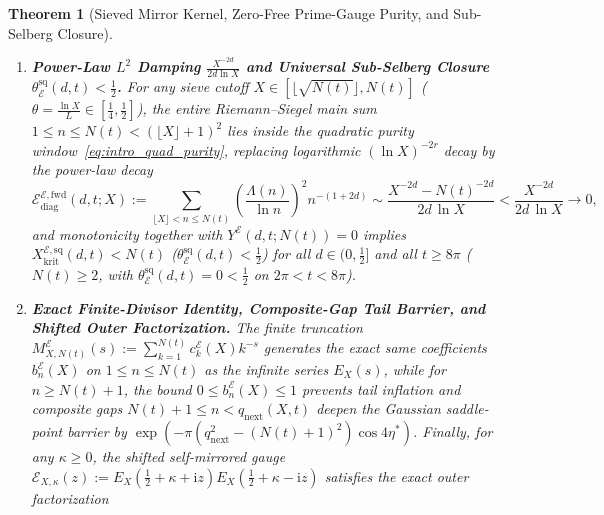 \documentclass[11pt,reqno]{amsart}
\newtheorem{theorem}{Theorem}[section]
\theoremstyle{definition}
\theoremstyle{remark}
\numberwithin{equation}{section}
\newcommand{\ii}{\mathrm{i}}
\begin{document}
\begin{theorem}[Sieved Mirror Kernel, Zero-Free Prime-Gauge Purity, and Sub-Selberg Closure]
\begin{enumerate}[label=\textup{(\roman*)},leftmargin=2.2em]
\begin{equation}\label{eq:intro_quad_purity}
b_N^{\mathcal{E}}(X) \equiv \frac{\Lambda(N)}{\ln N} \qquad \text{for all } \lfloor X\rfloor < N < (\lfloor X\rfloor + 1)^2,
\end{equation}
so every composite integer with $\ge 2$ distinct prime factors in $(X, X^2]$ vanishes identically. Moreover, in the weighted gauge $\mathcal{E}_{X,\mathbf{w}}(z)$, the negative hyperbolic mirror weight $w_n^*(d_0) := -(n^{2d_0}-1)^{-1} < 0$ annihilates the effective prime-power amplitude $C_n(d_0, w_n^*(d_0)) \equiv 0$ for all $2 \le n \le \lfloor X\rfloor$ on $d = d_0$ while introducing zero terms for $n > X$ ($0\%$ waterbed tail).
\item \textbf{Power-Law $L^2$ Damping $\frac{X^{-2d}}{2d\ln X}$ and Universal Sub-Selberg Closure $\theta_{\mathcal{E}}^{\mathrm{sq}}(d,t) < \frac{1}{2}$.} For any sieve cutoff $X \in [\lfloor\sqrt{N(t)}\rfloor, N(t)]$ ($\theta = \frac{\ln X}{L} \in [\frac{1}{4}, \frac{1}{2}]$), the entire Riemann--Siegel main sum $1 \le n \le N(t) < (\lfloor X\rfloor + 1)^2$ lies inside the quadratic purity window~\eqref{eq:intro_quad_purity}, replacing logarithmic $(\ln X)^{-2r}$ decay by the power-law decay
\begin{equation}\label{eq:intro_power_law}
\mathcal{E}_{\mathrm{diag}}^{\mathcal{E},\mathrm{fwd}}(d,t;X) := \sum_{\lfloor X\rfloor < n \le N(t)} \left(\frac{\Lambda(n)}{\ln n}\right)^2 n^{-(1+2d)} \sim \frac{X^{-2d} - N(t)^{-2d}}{2d\,\ln X} < \frac{X^{-2d}}{2d\,\ln X} \longrightarrow 0,
\end{equation}
and monotonicity together with $Y^{\mathcal{E}}(d,t;N(t)) = 0$ implies $X_{\mathrm{krit}}^{\mathcal{E},\mathrm{sq}}(d,t) < N(t)$ ($\theta_{\mathcal{E}}^{\mathrm{sq}}(d,t) < \frac{1}{2}$) for all $d \in (0, \frac{1}{2}]$ and all $t \ge 8\pi$ ($N(t) \ge 2$, with $\theta_{\mathcal{E}}^{\mathrm{sq}}(d,t) = 0 < \frac{1}{2}$ on $2\pi < t < 8\pi$).
\item \textbf{Exact Finite-Divisor Identity, Composite-Gap Tail Barrier, and Shifted Outer Factorization.} The finite truncation $M_{X,N(t)}^{\mathcal{E}}(s) := \sum_{k=1}^{N(t)} c_k^{\mathcal{E}}(X)k^{-s}$ generates the exact same coefficients $b_n^{\mathcal{E}}(X)$ on $1 \le n \le N(t)$ as the infinite series $E_X(s)$, while for $n \ge N(t)+1$, the bound $0 \le b_n^{\mathcal{E}}(X) \le 1$ prevents tail inflation and composite gaps $N(t)+1 \le n < q_{\mathrm{next}}(X,t)$ deepen the Gaussian saddle-point barrier by $\exp(-\pi(q_{\mathrm{next}}^2 - (N(t)+1)^2)\allowbreak\cos 4\eta^*)$. Finally, for any $\kappa \ge 0$, the shifted self-mirrored gauge $\mathcal{E}_{X,\kappa}(z) := E_X(\frac{1}{2}+\kappa+\ii z)\allowbreak E_X(\frac{1}{2}+\kappa-\ii z)$ satisfies the exact outer factorization

\end{enumerate}
\end{theorem}
\end{document}
